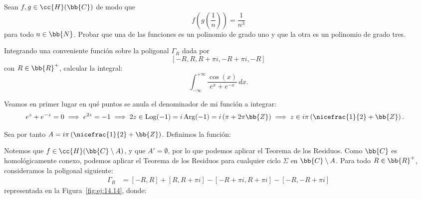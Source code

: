 \documentclass[12pt]{article}
\DeclareMathOperator{\Log}{Log}
\DeclareMathOperator{\Arg}{Arg}
\begin{document}
    \begin{ejercicio}[2.5 puntos]
        Sean $f, g \in \cc{H}(\bb{C})$ de modo que
        $$f\left(g\left(\frac{1}{n}\right)\right) = \frac{1}{n^3}$$
        para todo $n \in \bb{N}$.
        Probar que una de las funciones es un polinomio de grado uno y que la otra es un polinomio de grado tres.
    \end{ejercicio}



    \newpage
    \setcounter{ejercicio}{0}




    \begin{ejercicio}[2.5 puntos]\label{ej:14.14}
        Integrando una conveniente función sobre la poligonal $\Gamma_R$ dada por
        $$[-R, R, R + \pi i, -R + \pi i, -R]$$
        con $R \in \bb{R}^+$, calcular la integral:
        \begin{equation*}
            \int_{-\infty}^{+\infty} \frac{\cos(x)}{e^x + e^{-x}} \, dx.
        \end{equation*}



        Veamos en primer lugar en qué puntos se anula el denominador de mi función a integrar:
    \begin{align*}
        e^z + e^{-z} &= 0 \implies e^{2z} = -1 \implies 2z \in \Log(-1) = i\Arg(-1)=i\left(\pi + 2\pi \bb{Z}\right)
        \implies z \in i\pi \left(\nicefrac{1}{2} + \bb{Z}\right).
    \end{align*}

    Sea por tanto $A= i\pi \left(\nicefrac{1}{2} + \bb{Z}\right)$. Definimos la función:

    Notemos que $f\in \cc{H}(\bb{C}\setminus A)$, y que $A'=\emptyset$, por lo que podemos aplicar el Teorema de los Residuos. Como $\bb{C}$ es homológicamente conexo, podemos aplicar el Teorema de los Residuos para cualquier ciclo $\Sigma$ en $\bb{C}\setminus A$. Para todo $R\in \bb{R}^+$, consideramos la poligonal siguiente:
    \begin{align*}
        \Gamma_R &= [-R, R] + [R, R + \pi i] - [-R + \pi i, R + \pi i] - [-R, -R + \pi i]
    \end{align*}
    representada en la Figura~\ref{fig:ej:14.14}, donde:
    \begin{figure}
        \centering
\end{figure}
\end{ejercicio}
\end{document}
